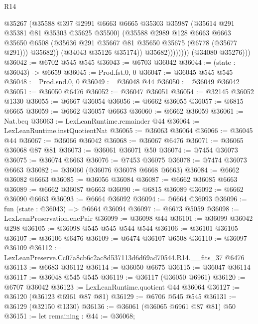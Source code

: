 \begin{lexlean}{R14}
\begin{coremodule}
                          @35267
                          (@35588
                            @397
                            @2991
                            @6663
                            @6665
                            @35303
                            @35987
                            (@35614 @291 @35381 @81 @35303 @35625 @35500)
                            (@35588
                              @2989
                              @128
                              @6663
                              @6663
                              @35650
                              @6508
                              (@35636 @291 @35667 @81 @35650 @35675 (@6778 (@35677 @291)))
                              @35682))
                          (@34043 @35126 @35174))
                        @35682))))))))
        (@34080 @35276)))
@36042 := @6702 @545 @545
@36043 := @6703 @36042
@36044 := (state : @36043) -> @6659
@36045 := Prod.fst.{0, 0}
@36047 := @36045 @545 @545
@36048 := Prod.snd.{0, 0}
@36049 := @36048 @44
@36050 := @36049 @36042
@36051 := @36050 @6476
@36052 := @36047 @36051
@36054 := @32145 @36052 @1330
@36055 := @6667 @36054
@36056 := @6662 @36055
@36057 := @6815 @6665
@36059 := @6662 @36057 @6663
@36060 := @6662 @36059
@36061 := Nat.beq
@36063 := LexLeanRuntime.remainder @44
@36064 := LexLeanRuntime.instQuotientNat
@36065 := @36063 @36064
@36066 := @36045 @44
@36067 := @36066 @36042
@36068 := @36067 @6476
@36071 := @36065 @36068 @87 @81
@36073 := @36061 @36071 @50
@36074 := @7454 @36073
@36075 := @36074 @6663
@36076 := @7453 @36075
@36078 := @7474 @36073 @6663
@36082 := @36060 (@36076 @36078 @6668 @6663)
@36084 := @6662 @36082 @6663
@36085 := @36056 @36084
@36087 := @6662 @36085 @6663
@36089 := @6662 @36087 @6663
@36090 := @6815 @36089
@36092 := @6662 @36090 @6663
@36093 := @6664 @36092
@36094 := @6664 @36093
@36096 := fun (state : @36043) => @6664 @36094
@36097 := @6673 @5059
@36098 := LexLeanPreservation.encPair
@36099 := @36098 @44
@36101 := @36099 @36042 @298
@36105 := @36098 @545 @545 @544 @544
@36106 := @36101 @36105
@36107 := @36106 @6476
@36109 := @6474 @36107 @6508
@36110 := @36097 @36109
@36112 := LexLeanPreserve.Cc07a8cb6c2ac8d537113d6d69ad70544.R14.__fits_37 @6476
@36113 := @6683 @36112
@36114 := @36050 @6675
@36115 := @36047 @36114
@36117 := @36048 @545 @545
@36119 := @36117 (@36050 @6961)
@36120 := @6707 @36042
@36123 := LexLeanRuntime.quotient @44 @36064
@36127 := @36120 (@36123 @6961 @87 @81)
@36129 := @6706 @545 @545
@36131 := @36129 (@32150 @1330)
@36136 := @36061 (@36065 @6961 @87 @81) @50
@36151 := let remaining : @44 := @36068;

\end{coremodule}
\end{lexlean}
